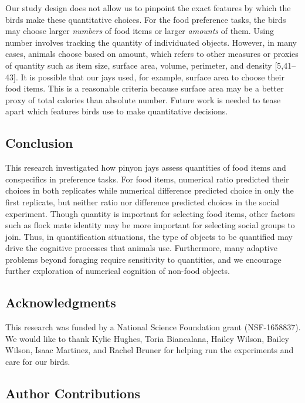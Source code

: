 \documentclass[
  ,doc,floatsintext]{apa6}
\begin{document}
Our study design does not allow us to pinpoint the exact features by which the birds make these quantitative choices. For the food preference tasks, the birds may choose larger \emph{numbers} of food items or larger \emph{amounts} of them. Using number involves tracking the quantity of individuated objects. However, in many cases, animals choose based on amount, which refers to other measures or proxies of quantity such as item size, surface area, volume, perimeter, and density {[}5,41--43{]}. It is possible that our jays used, for example, surface area to choose their food items. This is a reasonable criteria because surface area may be a better proxy of total calories than absolute number. Future work is needed to tease apart which features birds use to make quantitative decisions.

\hypertarget{conclusion}{%
\subsection{Conclusion}\label{conclusion}}

This research investigated how pinyon jays assess quantities of food items and conspecifics in preference tasks. For food items, numerical ratio predicted their choices in both replicates while numerical difference predicted choice in only the first replicate, but neither ratio nor difference predicted choices in the social experiment. Though quantity is important for selecting food items, other factors such as flock mate identity may be more important for selecting social groups to join. Thus, in quantification situations, the type of objects to be quantified may drive the cognitive processes that animals use. Furthermore, many adaptive problems beyond foraging require sensitivity to quantities, and we encourage further exploration of numerical cognition of non-food objects.

\hypertarget{acknowledgments}{%
\subsection{Acknowledgments}\label{acknowledgments}}

This research was funded by a National Science Foundation grant (NSF-1658837). We would like to thank Kylie Hughes, Toria Biancalana, Hailey Wilson, Bailey Wilson, Isaac Martinez, and Rachel Bruner for helping run the experiments and care for our birds.

\hypertarget{author-contributions}{%
\subsection{Author Contributions}\label{author-contributions}}
\end{document}
